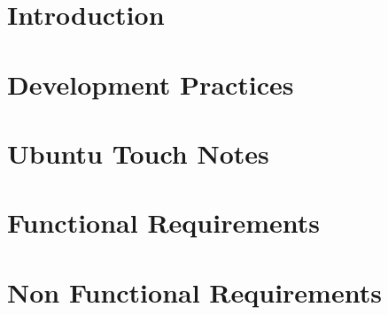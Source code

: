 



\chapter{Introduction}







\chapter{Development Practices}





\chapter{Ubuntu Touch Notes}








\newpage


\chapter{Functional Requirements}








\chapter{Non Functional Requirements}







%



